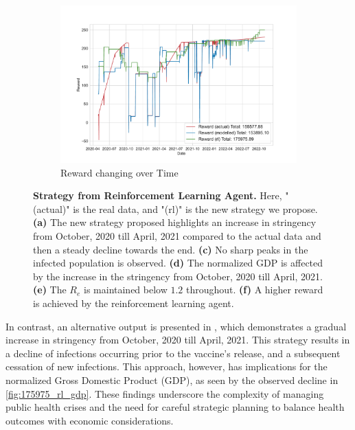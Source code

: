 \documentclass[tikz,fleqn,12pt]{wlscirep}
\begin{document}
\begin{figure}[htbp!]
\begin{subfigure}[t]{0.48\textwidth}
    \includegraphics[width=\linewidth]{images/175975/rl_reward.pdf}
    \caption{Reward changing over Time}
  \end{subfigure}
  \label{fig:175975_rl_reward}
  \caption{\textbf{Strategy from Reinforcement Learning Agent.} Here, "(actual)" is the real data, and "(rl)" is the new strategy we propose. \textbf{(a)} The new strategy proposed highlights an increase in stringency from October, 2020 till April, 2021 compared to the actual data and then a steady decline towards the end. \textbf{(c)} No sharp peaks in the infected population is observed. \textbf{(d)} The normalized GDP is affected by the increase in the stringency from October, 2020 till April, 2021. \textbf{(e)} The $R_e$ is maintained below $1.2$ throughout. \textbf{(f)} A higher reward is achieved by the reinforcement learning agent.}
\end{figure}

In contrast, an alternative output is presented in , which demonstrates a gradual increase in stringency from October, 2020 till April, 2021. This strategy results in a decline of infections occurring prior to the vaccine's release, and a subsequent cessation of new infections. This approach, however, has implications for the normalized Gross Domestic Product (GDP), as seen by the observed decline in \cref{fig:175975_rl_gdp}. These findings underscore the complexity of managing public health crises and the need for careful strategic planning to balance health outcomes with economic considerations.
\end{document}
